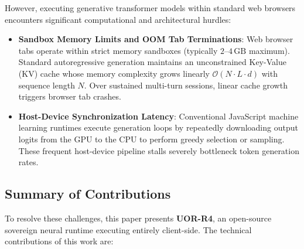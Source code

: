 \documentclass[11pt,a4paper]{article}
\theoremstyle{plain}
\theoremstyle{definition}
\theoremstyle{remark}
\begin{document}
However, executing generative transformer models within standard web browsers encounters significant computational and architectural hurdles:
\begin{itemize}[leftmargin=*]
    \item \textbf{Sandbox Memory Limits and OOM Tab Terminations}: Web browser tabs operate within strict memory sandboxes (typically $2\text{--}4\,\text{GB}$ maximum). Standard autoregressive generation maintains an unconstrained Key-Value (KV) cache whose memory complexity grows linearly $\mathcal{O}(N \cdot L \cdot d)$ with sequence length $N$. Over sustained multi-turn sessions, linear cache growth triggers browser tab crashes.
    \item \textbf{Host-Device Synchronization Latency}: Conventional JavaScript machine learning runtimes execute generation loops by repeatedly downloading output logits from the GPU to the CPU to perform greedy selection or sampling. These frequent host-device pipeline stalls severely bottleneck token generation rates.
\end{itemize}

\subsection{Summary of Contributions}

To resolve these challenges, this paper presents \textbf{UOR-R4}, an open-source sovereign neural runtime executing entirely client-side. The technical contributions of this work are:
\end{document}
